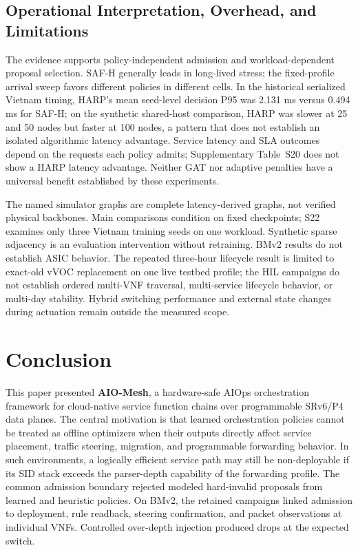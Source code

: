\documentclass[final,5p]{elsarticle}
\newcommand{\rev}[1]{\textcolor{revisiongreen}{#1}}
\let\newrev\rev
\begin{document}
\subsection{Operational Interpretation, Overhead, and Limitations}
\label{subsec:operational_interpretation}
\newrev{The evidence supports policy-independent admission and workload-dependent proposal selection. SAF-H generally leads in long-lived stress; the fixed-profile arrival sweep favors different policies in different cells. In the historical serialized Vietnam timing, HARP's mean seed-level decision P95 was 2.131 ms versus 0.494 ms for SAF-H; on the synthetic shared-host comparison, HARP was slower at 25 and 50 nodes but faster at 100 nodes, a pattern that does not establish an isolated algorithmic latency advantage. Service latency and SLA outcomes depend on the requests each policy admits; Supplementary Table~S20 does not show a HARP latency advantage. Neither GAT nor adaptive penalties have a universal benefit established by these experiments.}

\newrev{The named simulator graphs are complete latency-derived graphs, not verified physical backbones. Main comparisons condition on fixed checkpoints; S22 examines only three Vietnam training seeds on one workload. Synthetic sparse adjacency is an evaluation intervention without retraining. BMv2 results do not establish ASIC behavior. The repeated three-hour lifecycle result is limited to exact-old vVOC replacement on one live testbed profile; the HIL campaigns do not establish ordered multi-VNF traversal, multi-service lifecycle behavior, or multi-day stability. Hybrid switching performance and external state changes during actuation remain outside the measured scope.}

\section{Conclusion}
\label{sec:conclusion}
This paper presented \textbf{AIO-Mesh}, a hardware-safe AIOps orchestration framework for cloud-native service function chains over programmable SRv6/P4 data planes. The central motivation is that learned orchestration policies cannot be treated as offline optimizers when their outputs directly affect service placement, traffic steering, migration, and programmable forwarding behavior. In such environments, a logically efficient service path may still be non-deployable if its SID stack exceeds the parser-depth capability of the forwarding profile. \newrev{The common admission boundary rejected modeled hard-invalid proposals from learned and heuristic policies. On BMv2, the retained campaigns linked admission to deployment, rule readback, steering confirmation, and packet observations at individual VNFs. Controlled over-depth injection produced drops at the expected switch.}
\end{document}
